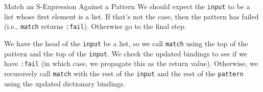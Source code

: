 \begin{algorithm}{Match an S-Expression Against a Pattern}
We should expect the
\lstinline[language=lisp]{input} to be a list whose first element is a list.
If that's not the case, then the pattern has failed (i.e.,
\lstinline[language=lisp]{match} returns \lstinline[language=lisp]{:fail}).
Otherwise go to the final step.

We have the head of the \lstinline[language=lisp]{input} be
a list, so we call \lstinline[language=lisp]{match} using the top of the
pattern and the top of the \lstinline[language=lisp]{input}. We check
the updated bindings to see if we have \lstinline[language=lisp]{:fail}
(in which case, we propagate this as the return value). Otherwise, we
recursively call \lstinline[language=lisp]{match}
with the rest of the \lstinline[language=lisp]{input} and the
rest of the \lstinline[language=lisp]{pattern} using the updated
dictionary bindings.\quad\qedsymbol
\end{algorithm}


